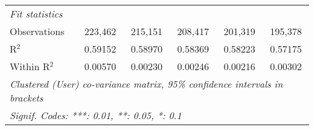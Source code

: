 \begin{table}[htbp]
\begin{threeparttable}[b]
\begin{tabular}{lccccc}
         \emph{Fit statistics}\\
         Observations              & 223,462          & 215,151          & 208,417          & 201,319          & 195,378\\  
         R$^2$                     & 0.59152          & 0.58970          & 0.58369          & 0.58223          & 0.57175\\  
         Within R$^2$              & 0.00570          & 0.00230          & 0.00246          & 0.00216          & 0.00302\\  
         \midrule \midrule
         \multicolumn{6}{l}{\emph{Clustered (User) co-variance matrix, 95\% confidence intervals in brackets}}\\
         \multicolumn{6}{l}{\emph{Signif. Codes: ***: 0.01, **: 0.05, *: 0.1}}\\
      \end{tabular}
   \end{threeparttable}
\end{table}


